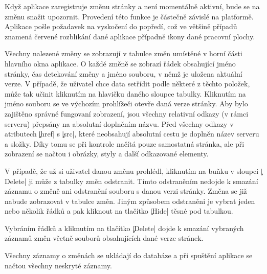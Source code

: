 Když aplikace zaregistruje změnu stránky a není momentálně aktivní, bude se na změnu snažit upozornit.
Provedení této funkce je částečně závislé na platformě. 
Aplikace pošle požadavek na vyskočení do popředí, což ve většině případů znamená červené rozblikání dané aplikace případně ikony dané pracovní plochy.

Všechny nalezené změny se zobrazují v tabulce změn umístěné v horní části hlavního okna aplikace.
O každé změně se zobrazí řádek obsahující jméno stránky, čas detekování změny a jméno souboru, v němž je uložena aktuální verze.
V případě, že uživatel chce data setřídit podle některé z těchto položek, může tak učinit kliknutím na hlavičku daného sloupce tabulky.
Kliknutím na jméno souboru se ve výchozím prohlížeči otevře daná verze stránky.
Aby bylo zajištěno správné fungovaní zobrazení, jsou všechny relativní odkazy (v rámci serveru) přepsány na absolutní doplněním názvu.
Před všechny odkazy v atributech \c|href| s \c|src|, které neobsahují absolutní cestu je doplněn název serveru a složky.
Díky tomu se při kontrole načítá pouze samostatná stránka, ale při zobrazení se načtou i obrázky, styly a další odkazované elementy.

V případě, že už si uživatel danou změnu prohlédl, kliknutím na buňku v sloupci \c|Delete| ji může z tabulky změn odstranit.
Tímto odstraněním nedojde k smazání záznamu o změně ani odstranění souboru s danou verzi stránky.
Změna se již nabude zobrazovat v tabulce změn.
Jiným způsobem odstraněni je vybrat jeden nebo několik řádků a pak kliknout na tlačítko \c|Hide| těsné pod tabulkou.

Vybráním řádků a kliknutím na tlačítko \c|Delete| dojde k smazání vybraných záznamů změn včetně souborů obsahujících dané verze stránek.

Všechny záznamy o změnách se ukládají do databáze a při spuštění aplikace se načtou všechny neskryté záznamy. 
